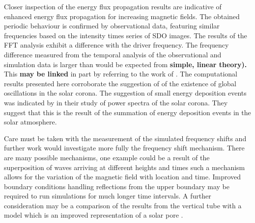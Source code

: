 \documentclass[physics,article,submit,pdftex,moreauthors]{Definitions/mdpi}
\begin{document}
 Closer inspection of the energy flux propagation results are indicative of enhanced energy flux propagation for increasing magnetic fields. The obtained periodic behaviour is confirmed by observational data, featuring similar frequencies based on the intensity times series of SDO images. The results of the FFT analysis exhibit a difference with the driver frequency. The frequency difference measured from the temporal analysis of the observational and simulation data is larger than would be expected from {\bf simple, linear theory). }
 This {\bf may be linked}
  in part by referring to the work of \citet{Campbell1989}. The computational results presented here corroborate the suggestion of \citet{Didkovsky2013} of the existence of global oscillations in the solar corona. The suggestion of small energy deposition events was indicated by \citet{Ireland2015} in their study of power spectra of the solar corona. They suggest that this is the result of the summation of energy deposition events in the solar atmosphere. 




 
 

Care must be taken with the measurement of the simulated frequency shifts and further work would investigate more fully the frequency shift mechanism. There are many possible mechanisms, one example could be a result of the superposition of waves arriving at different heights and times such a mechanism allows for the variation of the   magnetic field with location and time. Improved boundary conditions handling reflections from the upper boundary  may be required to run simulations for much longer time intervals. A further consideration may be a comparison of the results from the vertical tube with a model which is an improved representation of a solar pore \citet{Simon1970} \citet{Cameron2007}.
\end{document}

